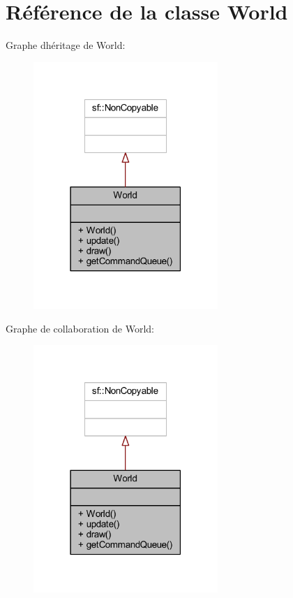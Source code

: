 \hypertarget{class_world}{}\section{Référence de la classe World}
\label{class_world}


Graphe d\textquotesingle{}héritage de World\+:\nopagebreak
\begin{figure}[H]
\begin{center}
\leavevmode
\includegraphics[width=198pt]{class_world__inherit__graph}
\end{center}
\end{figure}


Graphe de collaboration de World\+:\nopagebreak
\begin{figure}[H]
\begin{center}
\leavevmode
\includegraphics[width=198pt]{class_world__coll__graph}
\end{center}
\end{figure}
